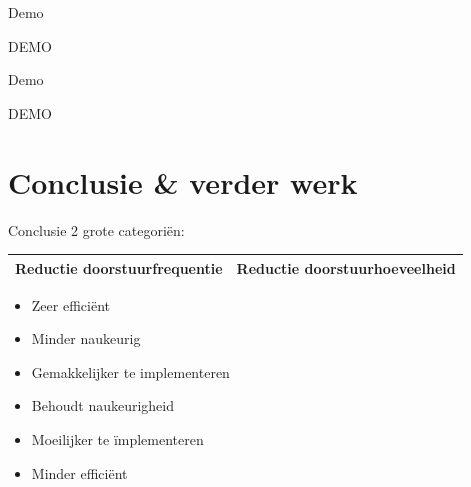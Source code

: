 \documentclass[presentation, bigger]{beamer}
\begin{document}
\begin{frame}{Demo}
  \begin{center}
    \Huge{DEMO}
  \end{center}

\end{frame}

\begin{frame}{Demo}
  \begin{center}
    \Huge{DEMO}
  \end{center}

\end{frame}

\section{Conclusie \& verder werk}
\begin{frame}{Conclusie}
  2 grote categoriën:
  \vspace{1cm}
  \begin{tabular}{ p{5.5cm}  p{5.5cm} }
    \toprule
    Reductie doorstuurfrequentie & Reductie doorstuurhoeveelheid   \\ 
    \toprule
  \end{tabular}    

  \begin{minipage}{.5\textwidth}
    \begin{itemize}
    \item Zeer efficiënt
    \item Minder naukeurig
    \item Gemakkelijker te implementeren
    \end{itemize}
    
  \end{minipage}%
  \begin{minipage}{.5\textwidth}
    \begin{itemize}
    \item Behoudt naukeurigheid
    \item Moeilijker te ïmplementeren
    \item Minder efficiënt
    \end{itemize}
  \end{minipage}
  \vspace{2cm}
  \hspace{2.5cm}
\end{frame}
\end{document}
